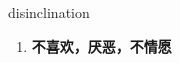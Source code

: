 
\begin{frame}
{\huge disinclination}
\begin{center}
\begin{enumerate}\Large
  \item \textbf{不喜欢，厌恶，不情愿}
\end{enumerate}
\end{center}
\end{frame}
